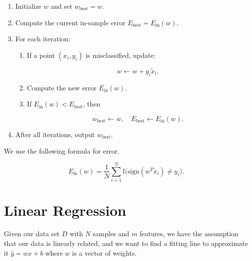 \begin{enumerate}

	\item Initialize \( w \) and set \( w_{\text{best}} = w \).

	\item Compute the current in-sample error \( E_{\text{best}} = E_{\text{in}}(w) \).

	\item For each iteration:

	      \begin{enumerate}

		      \item If a point \( (x_i, y_i) \) is misclassified, update:

		            \[
			            w \leftarrow w + y_i \tilde{x}_i.
		            \]

		      \item Compute the new error \( E_{\text{in}}(w) \).

		      \item If \( E_{\text{in}}(w) < E_{\text{best}} \), then

		            \[
			            w_{\text{best}} \leftarrow w, \quad E_{\text{best}} \leftarrow E_{\text{in}}(w).
		            \]

	      \end{enumerate}

	\item After all iterations, output \( w_{\text{best}} \).

\end{enumerate}

We use the following formula for error.

\[
	E_{\text{in}}(w) = \frac{1}{N} \sum_{i=1}^{N} \mathbb{I}\big( \text{sign}(w^T \tilde{x}_i) \neq y_i \big).
\]

\section{Linear Regression}

Given our data set \(D\) with \(N\) samples and \(m\) features, we have the assumption that our data is linearly related, and we want to find
a fitting line to approximate it \(\hat{y} = wx + b\) where \(w\) is a vector of weights.

